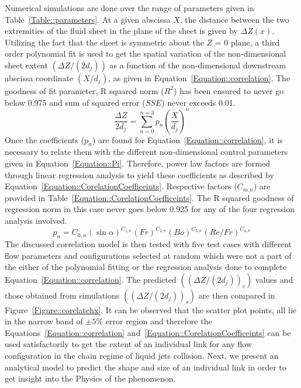 \documentclass[%
aip,
sd,%
amsmath,amssymb,
preprint,%
author-year,%
]{revtex4-1}
\begin{document}
Numerical simulations are done over the range of parameters given in Table~\ref{Table::parameters}. At a given abscissa $X$, the distance between the two extremities of the fluid sheet in the plane of the sheet is given by $\Delta Z(x)$. Utilizing the fact that the sheet is symmetric about the $Z$ = 0 plane, a third order polynomial fit is used to get the spatial variation of the non-dimensional sheet extent $\left(\Delta Z/(2d_j)\right)$ as a function of the non-dimensional downstream abscissa coordinate $\left(X/d_j\right)$, as given in Equation~\ref{Equation::correlation}. The goodness of fit parameter, R squared norm ($R^2$) has been ensured to never go below 0.975 and sum of squared error ($SSE$) never exceeds 0.01.   
\begin{equation}\label{Equation::correlation}
\frac{\Delta Z}{2d_j} = \sum_{n = 0}^{n = 3}p_n\left(\frac{X}{d_j}\right)^n
\end{equation}
Once the coefficients ($p_n$) are found for Equation~\ref{Equation::correlation}, it is necessary to relate them with the different non-dimensional control parameters given in Equation~\ref{Equation::Pi}. Therefore, power law factors are formed through linear regression analysis to yield these coefficients as described by Equation~\ref{Equation::CorelationCoefficeints}. Respective factors ($C_{m.n}$) are provided in Table~\ref{Equation::CorelationCoefficeints}. The R squared goodness of regression norm in this case never goes below 0.925 for any of the four regression analysis involved. 
\begin{equation}\label{Equation::CorelationCoefficeints}
p_n = C_{0,n}\left(\sin\alpha\right)^{C_{1,n}}\left(Fr\right)^{C_{2,n}}\left(Bo\right)^{C_{3,n}}\left(Re/Fr\right)^{C_{4,n}}
\end{equation}
The discussed correlation model is then tested with five test cases with different flow parameters and configurations selected at random which were not a part of the either of the polynomial fitting or the regression analysis done to complete Equation~\ref{Equation::correlation}. The predicted $\left((\Delta Z/(2d_j))_c\right)$ values and those obtained from simulations $\left((\Delta Z/(2d_j))_s\right)$ are then compared in Figure~\ref{Figure::corelatehx}. It can be observed that the scatter plot points, all lie in the narrow band of $\pm5\%$ error region and therefore the Equations~\ref{Equation::correlation} and~\ref{Equation::CorelationCoefficeints} can be used satisfactorily to get the extent of an individual link for any flow configuration in the chain regime of liquid jets collision. Next, we present an analytical model to predict the shape and size of an individual link in order to get insight into the Physics of the phenomenon.
\end{document}
